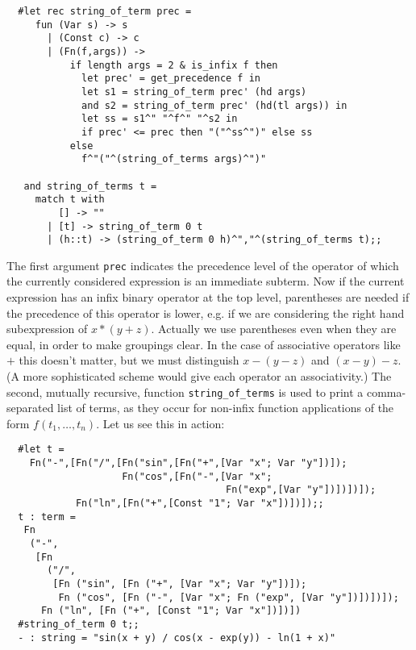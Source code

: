 \begin{boxed}\begin{verbatim}
  #let rec string_of_term prec =
     fun (Var s) -> s
       | (Const c) -> c
       | (Fn(f,args)) ->
           if length args = 2 & is_infix f then
             let prec' = get_precedence f in
             let s1 = string_of_term prec' (hd args)
             and s2 = string_of_term prec' (hd(tl args)) in
             let ss = s1^" "^f^" "^s2 in
             if prec' <= prec then "("^ss^")" else ss
           else
             f^"("^(string_of_terms args)^")"

   and string_of_terms t =
     match t with
         [] -> ""
       | [t] -> string_of_term 0 t
       | (h::t) -> (string_of_term 0 h)^","^(string_of_terms t);;
\end{verbatim}\end{boxed}

The first argument {\tt prec} indicates the precedence level of the operator of
which the currently considered expression is an immediate subterm. Now if the
current expression has an infix binary operator at the top level, parentheses
are needed if the precedence of this operator is lower, e.g. if we are
considering the right hand subexpression of $x * (y + z)$. Actually we use
parentheses even when they are equal, in order to make groupings clear. In the
case of associative operators like $+$ this doesn't matter, but we must
distinguish $x - (y - z)$ and $(x - y) - z$. (A more sophisticated scheme would
give each operator an associativity.) The second, mutually recursive, function
{\tt string\_of\_terms} is used to print a comma-separated list of terms, as
they occur for non-infix function applications of the form $f(t_1,\ldots,t_n)$.
Let us see this in action:

\begin{boxed}\begin{verbatim}
  #let t =
    Fn("-",[Fn("/",[Fn("sin",[Fn("+",[Var "x"; Var "y"])]);
                    Fn("cos",[Fn("-",[Var "x";
                                      Fn("exp",[Var "y"])])])]);
            Fn("ln",[Fn("+",[Const "1"; Var "x"])])]);;
  t : term =
   Fn
    ("-",
     [Fn
       ("/",
        [Fn ("sin", [Fn ("+", [Var "x"; Var "y"])]);
         Fn ("cos", [Fn ("-", [Var "x"; Fn ("exp", [Var "y"])])])]);
      Fn ("ln", [Fn ("+", [Const "1"; Var "x"])])])
  #string_of_term 0 t;;
  - : string = "sin(x + y) / cos(x - exp(y)) - ln(1 + x)"
\end{verbatim}\end{boxed}

